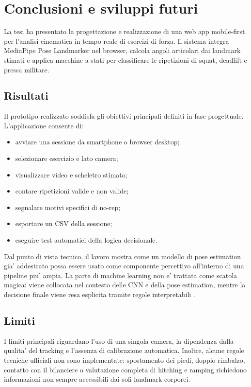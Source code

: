 
\chapter{Conclusioni e sviluppi futuri}
\label{ch:conclusions}

La tesi ha presentato la progettazione e realizzazione di una web app mobile-first per l'analisi cinematica in tempo reale di esercizi di forza. Il sistema integra MediaPipe Pose Landmarker nel browser, calcola angoli articolari dai landmark stimati e applica macchine a stati per classificare le ripetizioni di squat, deadlift e pressa militare.

\section{Risultati}

Il prototipo realizzato soddisfa gli obiettivi principali definiti in fase progettuale. L'applicazione consente di:

\begin{itemize}
  \item avviare una sessione da smartphone o browser desktop;
  \item selezionare esercizio e lato camera;
  \item visualizzare video e scheletro stimato;
  \item contare ripetizioni valide e non valide;
  \item segnalare motivi specifici di no-rep;
  \item esportare un CSV della sessione;
  \item eseguire test automatici della logica decisionale.
\end{itemize}

Dal punto di vista tecnico, il lavoro mostra come un modello di pose estimation gia' addestrato possa essere usato come componente percettivo all'interno di una pipeline piu' ampia. La parte di machine learning non e' trattata come scatola magica: viene collocata nel contesto delle CNN e della pose estimation, mentre la decisione finale viene resa esplicita tramite regole interpretabili \cite{geron2019hands,bazarevsky2020blazepose,mediapipePoseWeb2026}.

\section{Limiti}

I limiti principali riguardano l'uso di una singola camera, la dipendenza dalla qualita' del tracking e l'assenza di calibrazione automatica. Inoltre, alcune regole tecniche ufficiali non sono implementate: spostamento dei piedi, doppio rimbalzo, contatto con il bilanciere o valutazione completa di hitching e ramping richiedono informazioni non sempre accessibili dai soli landmark corporei.

